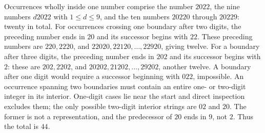 Occurrences wholly inside one number comprise the number $2022$, the nine numbers $d2022$ with $1\le d\le9$, and the ten numbers $20220$ through $20229$: twenty in total. For occurrences crossing one boundary after two digits, the preceding number ends in $20$ and its successor begins with $22$. These preceding numbers are $220,2220$, and $22020,22120,\ldots,22920$, giving twelve. For a boundary after three digits, the preceding number ends in $202$ and its successor begins with $2$: these are $202,2202$, and $20202,21202,\ldots,29202$, another twelve. A boundary after one digit would require a successor beginning with $022$, impossible. An occurrence spanning two boundaries must contain an entire one- or two-digit integer in its interior. One-digit cases lie near the start and direct inspection excludes them; the only possible two-digit interior strings are $02$ and $20$. The former is not a representation, and the predecessor of $20$ ends in $9$, not $2$. Thus the total is $\boxed{44}$.
